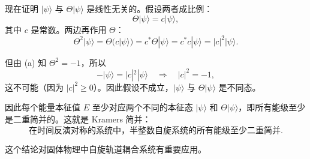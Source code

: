 \begin{solution}
		现在证明 $|\psi\rangle$ 与 $\Theta|\psi\rangle$ 是线性无关的。假设两者成比例：
		\[
		\Theta|\psi\rangle = c|\psi\rangle,
		\]
		其中 $c$ 是常数。两边再作用 $\Theta$：
		\[
		\Theta^2|\psi\rangle = \Theta(c|\psi\rangle) = c^*\Theta|\psi\rangle = c^*c|\psi\rangle = |c|^2|\psi\rangle.
		\]

		但由 (a) 知 $\Theta^2=-1$，所以
		\[
		-|\psi\rangle = |c|^2|\psi\rangle \quad\Longrightarrow\quad |c|^2 = -1,
		\]
		这不可能（因为 $|c|^2\ge0$）。因此假设不成立，$|\psi\rangle$ 与 $\Theta|\psi\rangle$ 是不同态。

		因此每个能量本征值 $E$ 至少对应两个不同的本征态 $|\psi\rangle$ 和 $\Theta|\psi\rangle$，即所有能级至少是二重简并的。这就是 Kramers 简并：
		\[
		\boxed{\text{在时间反演对称的系统中，半整数自旋系统的所有能级至少二重简并}}.
		\]

		这个结论对固体物理中自旋轨道耦合系统有重要应用。
		\end{solution}
